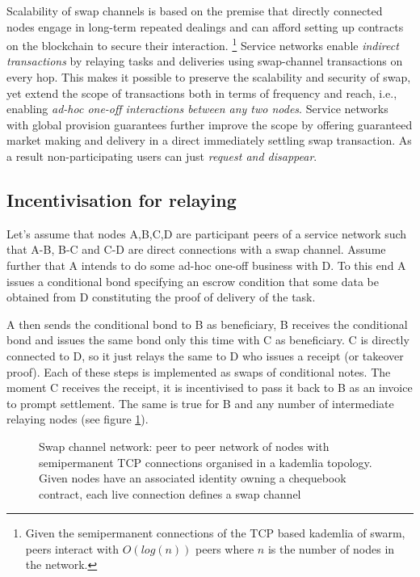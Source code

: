 \documentclass[a4paper,10pt]{article}
\newcommand\gloss[1]{\emph{\gls{#1}}}
\begin{document}
Scalability of
swap channels is based on the premise that directly connected nodes engage in long-term repeated
dealings and can afford setting up contracts on the blockchain to secure their interaction.%
%
\footnote{Given the semipermanent connections of the TCP based kademlia of swarm, peers interact with
$O(log(n))$ peers where $n$ is the number of nodes in the network.}
%
Service networks enable \gloss{indirect transactions} by relaying tasks and deliveries using
swap-channel transactions on every hop.
This makes it possible to preserve the scalability and security
of swap, yet extend the scope of transactions both in terms of
frequency and reach, i.e., enabling \emph{ad-hoc one-off interactions between any two nodes}.
Service networks with global provision guarantees further improve the scope by
offering guaranteed market making and delivery in a direct immediately settling
swap transaction. As a result non-participating users can just \emph{request and disappear}.

\subsection{Incentivisation for relaying}

Let's assume that nodes A,B,C,D are participant peers of a service network such that
A-B, B-C and C-D are direct connections with a swap channel.
Assume further that A intends to do some ad-hoc one-off business with D. To this end
 A issues a conditional bond specifying an escrow
condition that some data be obtained from D constituting the proof of delivery of the task.

A then sends the conditional bond to B as beneficiary, B receives the conditional bond
and issues the same bond
only this time with C as beneficiary. C is directly connected to D, so
it just relays the same to D who issues a receipt (or takeover proof).
Each of these steps is implemented as swaps of conditional notes. The moment C receives
the receipt, it is incentivised to pass it back to B as an invoice to prompt
settlement. The same is true for B and any number of intermediate relaying nodes
(see figure \ref{fig:swapchannelnetwork}).

\begin{center}
\begin{figure}
\begin{center}
\end{center}
\caption{Swap channel network: peer to peer network of nodes with semipermanent TCP connections organised in
a kademlia topology. Given nodes have an associated identity owning a chequebook contract,
each live connection defines a swap channel}
\label{fig:swapchannelnetwork}
\end{figure}
\end{center}
\end{document}
